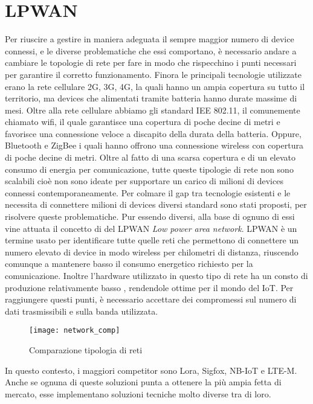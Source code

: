 \section{LPWAN}
Per riuscire a gestire in maniera adeguata il sempre maggior numero di device
connessi, e le diverse problematiche che essi comportano, è necessario andare a
cambiare le topologie di rete per fare in modo che rispecchino i punti necessari
per garantire il corretto funzionamento. Finora le principali tecnologie
utilizzate erano la rete cellulare 2G, 3G, 4G, la quali hanno un ampia copertura
su tutto il territorio, ma devices che alimentati tramite batteria hanno durate
massime di mesi. Oltre alla rete cellulare abbiamo gli standard IEE 802.11, il
comunemente chiamato wifi, il quale garantisce una copertura di poche decine di
metri e favorisce una connessione veloce a discapito della durata della
batteria. Oppure, Bluetooth e ZigBee i quali hanno offrono una connessione
wireless con copertura di poche decine di metri. Oltre al fatto di una scarsa
copertura e di un elevato consumo di energia per comunicazione, tutte queste
tipologie di rete non sono scalabili cioè non sono ideate per supportare un
carico di milioni di devices connessi contemporaneamente. Per colmare il gap tra
tecnologie esistenti e le necessita di connettere milioni di devices diversi
standard sono stati proposti, per risolvere queste problematiche. Pur essendo
diversi, alla base di ognuno di essi vine attuata il concetto di del LPWAN
\emph{Low power area network}. LPWAN è un termine usato per identificare tutte
quelle reti che permettono di connettere un numero elevato di device in modo
wireless per chilometri di distanza, riuscendo comunque a mantenere basso il
consumo energetico richiesto per la comunicazione. Inoltre l'hardware utilizzato
in questo tipo di rete ha un consto di produzione relativamente basso ,
rendendole ottime per il mondo del IoT. Per raggiungere questi punti, è
necessario accettare dei compromessi sul numero di dati trasmissibili e sulla
banda utilizzata. 

\begin{figure}[h]
        \centering 
                \texttt{[image: network\_comp]}
        \caption{Comparazione tipologia di reti}
\end{figure}

In questo contesto, i maggiori competitor sono Lora, Sigfox, NB-IoT e LTE-M.
Anche se ognuna di queste soluzioni punta a ottenere la più ampia fetta di
mercato, esse implementano soluzioni tecniche molto diverse tra di loro.
